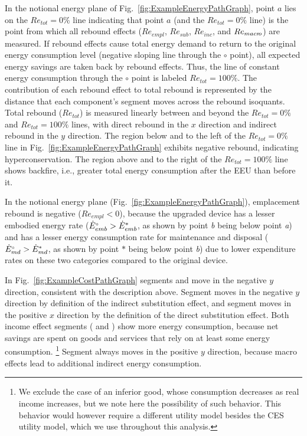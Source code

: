 \documentclass[12pt]{article}\usepackage[]{graphicx}\usepackage[]{xcolor}
\begin{document}
In the notional energy plane of Fig.~\ref{fig:ExampleEnergyPathGraph}, 
point $a$ lies on the $Re_{tot} = 0\%$ line
indicating that point $a$ (and the $Re_{tot} = 0\%$ line)
is the point from which all rebound effects 
($Re_{empl}$, $Re_{sub}$, $Re_{inc}$, and $Re_{macr\!o}$)
are measured.
If rebound effects cause 
total energy demand to return to the original energy consumption level 
(negative sloping line through the $\circ$ point), 
all expected energy savings are taken back by rebound effects. 
Thus, the line of constant energy consumption through the $\circ$ point is labeled
$Re_{tot} = 100\%$.
The contribution of each rebound effect to total rebound 
is represented by the distance that each component's segment
moves across the rebound isoquants.  
Total rebound ($Re_{tot}$) is measured linearly between and beyond the
$Re_{tot} = 0\%$ and $Re_{tot} = 100\%$ lines, 
with direct rebound in the $x$ direction and 
indirect rebound in the $y$ direction.
The region below and to the left of the $Re_{tot} = 0\%$ line
in Fig.~\ref{fig:ExampleEnergyPathGraph}
exhibits negative rebound, indicating hyperconservation.
The region above and to the right of the $Re_{tot} = 100\%$ line 
shows backfire, 
i.e., greater total energy consumption after the EEU than before it. 

In the notional energy plane (Fig.~\ref{fig:ExampleEnergyPathGraph}), 
emplacement rebound is negative ($Re_{empl} < 0$),
because the upgraded device has a lesser
embodied energy rate (${}{\dot{E}}^{\scriptscriptstyle \circ}_{emb} > {\dot{E}}^*_{emb}$,
as shown by point \emph{b} being below point \emph{a})
and has a lesser energy consumption rate for maintenance and disposal 
(${}{\dot{E}}^{\scriptscriptstyle \circ}_{md} > {\dot{E}}^*_{md}$, 
as shown by point $*$ being below point \emph{b})
due to lower expenditure rates on these two categories
compared to the original device.

In Fig.~\ref{fig:ExampleCostPathGraph} segments \ab{} and \bstar{}
move in the negative $y$ direction,
consistent with the description above.
Segment \starc{} moves in the negative $y$ direction
by definition of the indirect substitution effect,
and segment \chat{} moves in the positive $x$ direction 
by the definition of the direct substitution effect. 
Both income effect segments (\hatd{} and \dbar{})
show more energy consumption, because net savings are spent
on goods and services that rely on at least some energy consumption.%
\footnote{
  We exclude the case of an inferior good, whose consumption decreases
  as real income increases, but 
  we note here the possibility of such behavior. 
  This behavior would
  however require a different utility model 
  besides the CES utility model,
  which we use throughout this analysis.
}
%
Segment \bartilde{} always moves in the positive $y$ direction,
because macro effects lead to additional indirect energy consumption.
\end{document}
